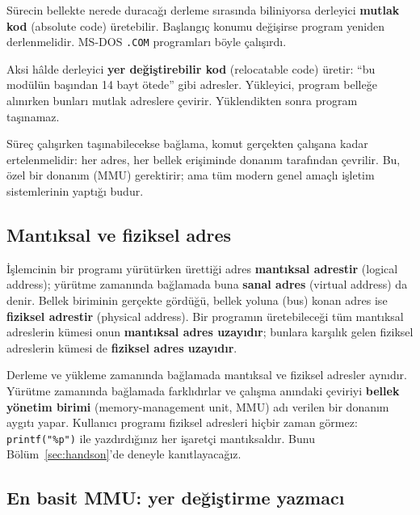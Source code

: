\documentclass[11pt,a4paper]{article}
\newcommand{\term}[1]{\textbf{\color{mintdeep}#1}}
\newcommand{\cmd}[1]{\texttt{#1}}
\begin{document}
\begin{description}[leftmargin=0pt,style=nextline,itemsep=0.3em]
  \item[Derleme zamanı (compile time)] Sürecin bellekte nerede duracağı derleme sırasında biliniyorsa derleyici \term{mutlak kod} (absolute code) üretebilir. Başlangıç konumu değişirse program yeniden derlenmelidir. MS-DOS \texttt{.COM} programları böyle çalışırdı.
  \item[Yükleme zamanı (load time)] Aksi hâlde derleyici \term{yer değiştirebilir kod} (relocatable code) üretir: ``bu modülün başından 14 bayt ötede'' gibi adresler. Yükleyici, program belleğe alınırken bunları mutlak adreslere çevirir. Yüklendikten sonra program taşınamaz.
  \item[Yürütme zamanı (execution time)] Süreç çalışırken taşınabilecekse bağlama, komut gerçekten çalışana kadar ertelenmelidir: her adres, her bellek erişiminde donanım tarafından çevrilir. Bu, özel bir donanım (MMU) gerektirir; ama tüm modern genel amaçlı işletim sistemlerinin yaptığı budur.
\end{description}

\subsection{Mantıksal ve fiziksel adres}

İşlemcinin bir programı yürütürken ürettiği adres \term{mantıksal adrestir} (logical address); yürütme zamanında bağlamada buna \term{sanal adres} (virtual address) da denir. Bellek biriminin gerçekte gördüğü, bellek yoluna (bus) konan adres ise \term{fiziksel adrestir} (physical address). Bir programın üretebileceği tüm mantıksal adreslerin kümesi onun \term{mantıksal adres uzayıdır}; bunlara karşılık gelen fiziksel adreslerin kümesi de \term{fiziksel adres uzayıdır}.

Derleme ve yükleme zamanında bağlamada mantıksal ve fiziksel adresler aynıdır. Yürütme zamanında bağlamada farklıdırlar ve çalışma anındaki çeviriyi \term{bellek yönetim birimi} (memory-management unit, MMU) adı verilen bir donanım aygıtı yapar. Kullanıcı programı fiziksel adresleri hiçbir zaman görmez: \cmd{printf("\%p")} ile yazdırdığınız her işaretçi mantıksaldır. Bunu Bölüm~\ref{sec:handson}'de deneyle kanıtlayacağız.

\subsection{En basit MMU: yer değiştirme yazmacı}
\end{document}
